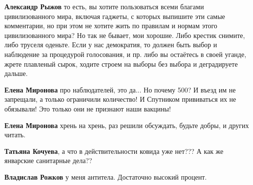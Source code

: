 \begin{itemize}
\begin{itemize}
\textbf{Александр Рыжов} то есть, вы хотите пользоваться всеми благами
цивилизованного мира, включая гаджеты, с которых выпишите эти самые
комментарии, но при этом не хотите жить по правилам и нормам этого
цивилизованного мира? Но так не бывает, мои хорошие. Либо крестик снимите, либо
труселя оденьте. Если у нас демократия, то должен быть выбор и наблюдение за
процедурой голосования, и пр. либо вы остаётесь в своей уганде, жрете плавленый
сырок, ходите строем на выборы без выбора и деградируете дальше.

 
\textbf{Елена Миронова} про наблюдателей, это да... Но почему 500? И въезд им не запрещали, а только ограничили количество! И Спутником прививаться их не обязывали! Это только они не признают наши вакцины!

 
\textbf{Елена Миронова} хрень на хрень, раз решили обсуждать, будьте добры, и других читать.

 
\textbf{Татьяна Кочуева}, а что в действительности ковида уже нет??? А как же январские санитарные дела??

 
\textbf{Владислав Рожков} у меня антитела. Достаточно высокий процент.


\end{itemize}

 

\end{itemize}
